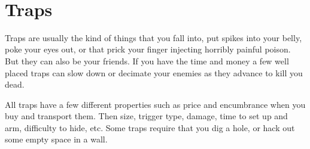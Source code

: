 \











\section*{Traps}

Traps are usually the kind of things that you fall into, put spikes into your belly, poke your eyes out, or that prick your finger injecting horribly painful poison. But they can also be your friends. If you have the time and money a few well placed traps can slow down or decimate your enemies as they advance to kill you dead.

All traps have a few different properties such as price and encumbrance when you buy and transport them. Then size, trigger type, damage, time to set up and arm, difficulty to hide, etc. Some traps require that you dig a hole, or hack out some empty space in a wall.

\

